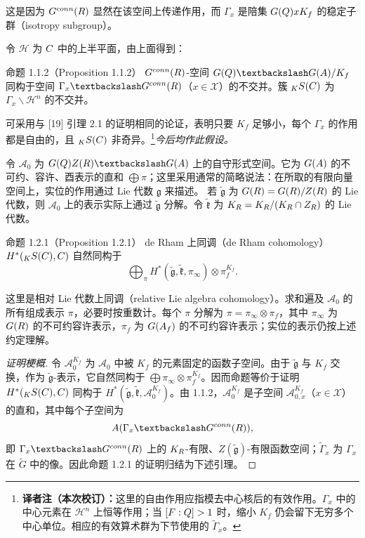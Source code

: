 这是因为 $G^{conn}(R)$ 显然在该空间上传递作用，而 $\Gamma_x$ 是陪集 $G(Q)xK_f$ 的稳定子群（isotropy subgroup）。

令 $\mathcal H$ 为 $C$ 中的上半平面，由上面得到：

\begin{originaltheorem}{命题 1.1.2（Proposition 1.1.2）}
$G^{conn}(R)$-空间 $G(\Q)\backslash G(\A)/K_f$ 同构于空间 $\Gamma_x\backslash G^{\mathrm{conn}}(\R)$（$x\in\mathcal X$）的不交并。簇 ${}_KS(C)$ 为 $\Gamma_x\backslash\mathcal H^n$ 的不交并。
\end{originaltheorem}

可采用与 [19] 引理 2.1 的证明相同的论证，表明只要 $K_f$ 足够小，每个 $\Gamma_x$ 的作用都是自由的，且 ${}_KS(C)$ 非奇异。\footnote{\textbf{译者注（本次校订）：}这里的自由作用应指模去中心核后的有效作用。$\Gamma_x$ 中的中心元素在 $\mathcal H^n$ 上恒等作用；当 $[F:Q]>1$ 时，缩小 $K_f$ 仍会留下无穷多个中心单位。相应的有效算术群为下节使用的 $\widetilde\Gamma_x$。}\emph{今后均作此假设。}

令 $\mathcal A_0$ 为 $G(\Q)Z(\R)\backslash G(\A)$ 上的自守形式空间。它为 $G(A)$ 的不可约、容许、酉表示的直和 $\bigoplus\pi$；这里采用通常的简略说法：在所取的有限向量空间上，实位的作用通过 Lie 代数 $\mathfrak g$ 来描述。
若 $\widetilde{\mathfrak g}$ 为 $G(R)=G(R)/Z(R)$ 的 Lie 代数，则 $\mathcal A_0$ 上的表示实际上通过 $\widetilde{\mathfrak g}$ 分解。令 $\widetilde{\mathfrak k}$ 为 $K_R=K_R/(K_R\cap Z_R)$ 的 Lie 代数。

\begin{originaltheorem}{命题 1.2.1（Proposition 1.2.1）}
de Rham 上同调（de Rham cohomology）$H^*({}_KS(C),C)$ 自然同构于
\[
 \bigoplus_\pi H^*(\widetilde{\mathfrak g},\widetilde{\mathfrak k},\pi_\infty)
 \otimes\pi_f^{K_f}.
\]
\end{originaltheorem}

这里是相对 Lie 代数上同调（relative Lie algebra cohomology）。求和遍及 $\mathcal A_0$ 的所有组成表示 $\pi$，必要时按重数计。每个 $\pi$ 分解为 $\pi=\pi_\infty\otimes\pi_f$，其中 $\pi_\infty$ 为 $G(R)$ 的不可约容许表示，$\pi_f$ 为 $G(A_f)$ 的不可约容许表示；实位的表示仍按上述约定理解。

\begin{proof}[证明梗概]
令 $\mathcal A_0^{K_f}$ 为 $\mathcal A_0$ 中被 $K_f$ 的元素固定的函数子空间。由于 $\widetilde{\mathfrak g}$ 与 $K_f$ 交换，作为 $\widetilde{\mathfrak g}$-表示，它自然同构于 $\bigoplus\pi_\infty\otimes\pi_f^{K_f}$。因而命题等价于证明 $H^*({}_KS(C),C)$ 同构于 $H^*(\widetilde{\mathfrak g},\widetilde{\mathfrak k},\mathcal A_0^{K_f})$。由 1.1.2，$\mathcal A_0^{K_f}$ 是子空间 $\mathcal A_{0,x}^{K_f}$（$x\in\mathcal X$）的直和，其中每个子空间为
\[
 \mathcal A(\widetilde\Gamma_x\backslash\widetilde G^{\mathrm{conn}}(\R)),
\]
即 $\widetilde\Gamma_x\backslash\widetilde G^{\mathrm{conn}}(\R)$ 上的 $K_R$-有限、$Z(\widetilde{\mathfrak g})$-有限函数空间；$\widetilde\Gamma_x$ 为 $\Gamma_x$ 在 $\widetilde G$ 中的像。因此命题 1.2.1 的证明归结为下述引理。
\end{proof}

